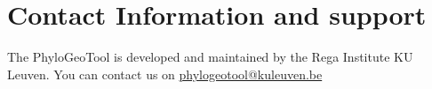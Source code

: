 \documentclass[a4paper, 11pt]{article} %
\begin{document}
\section{Contact Information and support }

The PhyloGeoTool is developed and maintained by the Rega Institute KU Leuven.
You can contact us on \href{mailto:phylogeotool@kuleuven.be}{phylogeotool@kuleuven.be}





\end{document}
